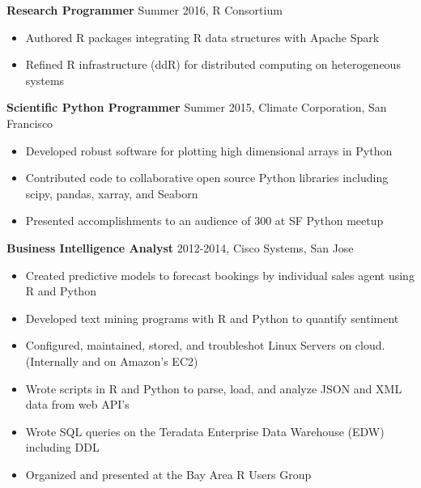 \documentclass{article}
\begin{document}
\begin{description}

\item  \textbf{Research Programmer} 
    \hspace{.5cm} 
    Summer 2016, R Consortium
  
\begin{itemize}
\item Authored R packages integrating R data structures with Apache Spark
\item Refined R infrastructure (ddR) for distributed computing on
    heterogeneous systems
\end{itemize}

\item  \textbf{Scientific Python Programmer} 
    \hspace{.5cm} 
    Summer 2015, Climate Corporation, San Francisco
  
\begin{itemize}
\item Developed robust software for plotting high dimensional arrays in
    Python
\item Contributed code to collaborative open source Python libraries including
    scipy, pandas, xarray, and Seaborn
\item Presented accomplishments to an audience of 300 at SF Python meetup
\end{itemize}

\item  \textbf{Business Intelligence Analyst} 
    \hspace{.5cm} 
    2012-2014, Cisco Systems, San Jose
  
\begin{itemize}
\item Created predictive models to forecast bookings by individual sales agent using R and Python
\item Developed text mining programs with R and Python to quantify sentiment
\item Configured, maintained, stored, and troubleshot Linux Servers on cloud. (Internally and on Amazon's EC2)
\item Wrote scripts in R and Python to parse, load, and analyze JSON and XML data from web API's
\item Wrote SQL queries on the Teradata Enterprise Data Warehouse (EDW) including DDL
\item Organized and presented at the Bay Area R Users Group
\end{itemize}

\end{description}
\end{document}
